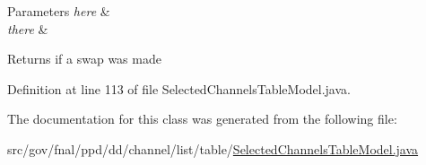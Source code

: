\begin{DoxyParams}{Parameters}
{\em here} & \\
\hline
{\em there} & \\
\hline
\end{DoxyParams}
\begin{DoxyReturn}{Returns}
if a swap was made 
\end{DoxyReturn}


Definition at line 113 of file Selected\-Channels\-Table\-Model.\-java.



The documentation for this class was generated from the following file\-:\begin{DoxyCompactItemize}
\item 
src/gov/fnal/ppd/dd/channel/list/table/\hyperlink{SelectedChannelsTableModel_8java}{Selected\-Channels\-Table\-Model.\-java}\end{DoxyCompactItemize}
